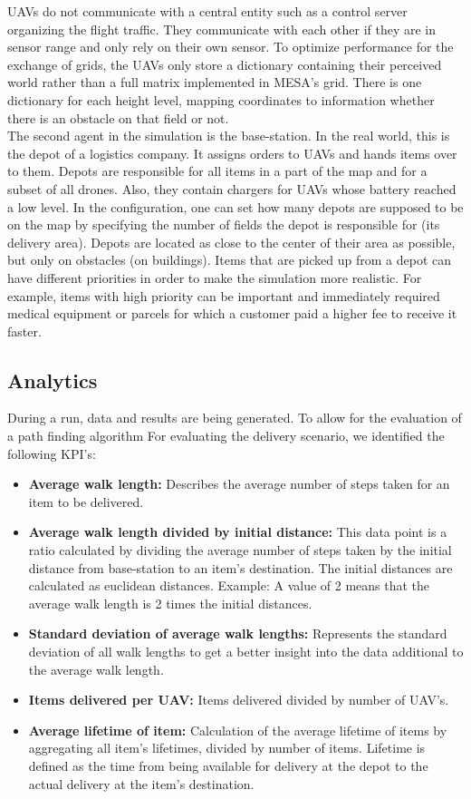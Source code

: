 UAVs do not communicate with a central entity such as a control server organizing the flight traffic. They communicate with each other if they are in sensor range and only rely on their own sensor.
To optimize performance for the exchange of grids, the UAVs only store a dictionary containing their perceived world rather than a full matrix implemented in MESA's grid.
There is one dictionary for each height level, mapping coordinates to information whether there is an obstacle on that field or not.  
\\
The second agent in the simulation is the base-station. In the real world, this is the depot of a logistics company. It assigns orders to UAVs and hands items over to them. Depots are responsible for all items in a part of the map and for a subset of all drones. Also, they contain chargers for UAVs whose battery reached a low level. In the configuration, one can set how many depots are supposed to be on the map by specifying the number of fields the depot is responsible for (its delivery area). Depots are located as close to the center of their area as possible, but only on obstacles (on buildings). Items that are picked up from a depot can have different priorities in order to make the simulation more realistic. For example, items with high priority can be important and immediately required medical equipment or parcels for which a customer paid a higher fee to receive it faster.



\subsection{Analytics}\label{sec:KPI}
During a run, data and results are being generated. To allow for the evaluation of a path finding algorithm
For evaluating the delivery scenario, we identified the following KPI's:
\begin{itemize}
	\item \textbf{Average walk length:} Describes the average number of steps taken for an item to be delivered. 
	\item \textbf{Average walk length divided by initial distance:} This data point is a ratio calculated by dividing the average number of steps taken by the initial distance from base-station to an item's destination. The initial distances are calculated as euclidean distances. Example: A value of 2 means that the average walk length is 2 times the initial distances.
	\item \textbf{Standard deviation of average walk lengths:} Represents the standard deviation of all walk lengths to get a better insight into the data additional to the average walk length.
	\item \textbf{Items delivered per UAV:} Items delivered divided by number of UAV's.
	\item \textbf{Average lifetime of item:} Calculation of the average lifetime of items by aggregating all item's lifetimes, divided by number of items. Lifetime is defined as the time from being available for delivery at the depot to the actual delivery at the item's destination.
\end{itemize}

